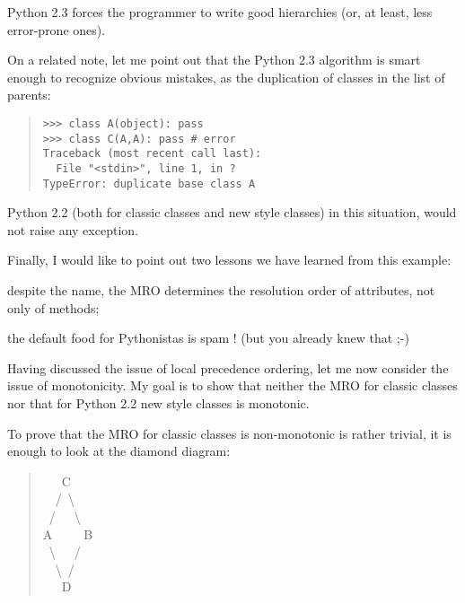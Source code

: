 \documentclass[10pt,english]{article}
\begin{document}
Python 2.3 forces the programmer to write good hierarchies (or, at
least, less error-prone ones).

On a related note, let me point out that the Python 2.3 algorithm is
smart enough to recognize obvious mistakes, as the duplication of
classes in the list of parents:
\begin{quote}
\begin{verbatim}>>> class A(object): pass
>>> class C(A,A): pass # error
Traceback (most recent call last):
  File "<stdin>", line 1, in ?
TypeError: duplicate base class A\end{verbatim}
\end{quote}

Python 2.2 (both for classic classes and new style classes) in this
situation, would not raise any exception.

Finally, I would like to point out two lessons we have learned from this
example:
\begin{list}{.}
{
\setlength{\rightmargin}{\leftmargin}
}
\item {} 
despite the name, the MRO determines the resolution order of
attributes, not only of methods;

\item {} 
the default food for Pythonistas is spam !  (but you already knew
that ;-)

\end{list}

Having discussed the issue of local precedence ordering, let me now
consider the issue of monotonicity.  My goal is to show that neither the
MRO for classic classes nor that for Python 2.2 new style classes is
monotonic.

To prove that the MRO for classic classes is non-monotonic is rather
trivial, it is enough to look at the diamond diagram:
\begin{quote}
\begin{ttfamily}\begin{flushleft}
\mbox{~~~C}\\
\mbox{~~/~{\textbackslash}}\\
\mbox{~/~~~{\textbackslash}}\\
\mbox{A~~~~~B}\\
\mbox{~{\textbackslash}~~~/}\\
\mbox{~~{\textbackslash}~/}\\
\mbox{~~~D}
\end{flushleft}\end{ttfamily}
\end{quote}
\end{document}
